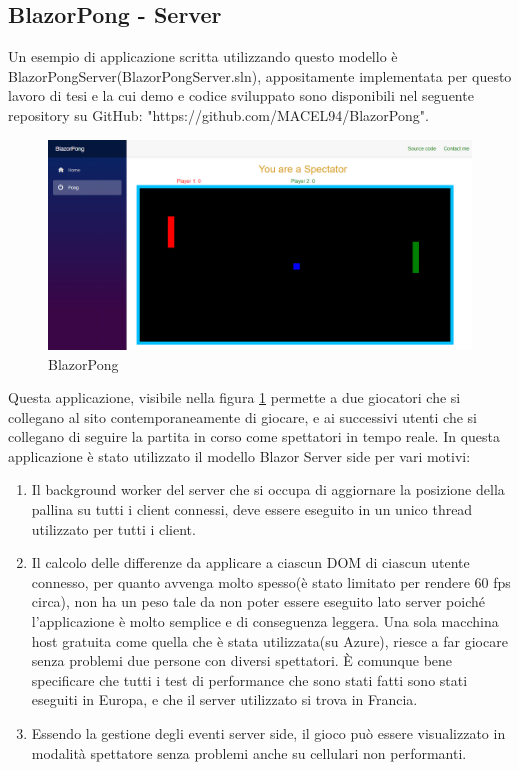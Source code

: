 \subsection{BlazorPong - Server}\label{sez:bpongserv}
Un esempio di applicazione scritta utilizzando questo modello \`e BlazorPongServer(BlazorPongServer.sln), appositamente implementata per questo lavoro di tesi e la cui demo e codice sviluppato sono disponibili nel seguente repository su GitHub: \linebreak "https://github.com/MACEL94/BlazorPong".

\begin{figure}[H]
	\centerline{\includegraphics[scale=0.3]{figure/BlazorPong.PNG}}
	\caption{BlazorPong}
	\label{fig:BlazorPong}
\end{figure}

Questa applicazione, visibile nella figura \ref{fig:BlazorPong} permette a due giocatori che si collegano al sito contemporaneamente di giocare, e ai successivi utenti che si collegano di seguire la partita in corso come spettatori in tempo reale.
In questa applicazione \`e stato utilizzato il modello Blazor Server side per vari motivi:
\begin{enumerate}
	\item Il background worker del server che si occupa di aggiornare la posizione della pallina su tutti i client connessi, deve essere eseguito in un unico thread utilizzato per tutti i client.
	\item Il calcolo delle differenze da applicare a ciascun DOM di ciascun utente connesso, per quanto avvenga molto spesso(\`e stato limitato per rendere 60 fps circa), non ha un peso tale da non poter essere eseguito lato server poich\'e l'applicazione \`e molto semplice e di conseguenza leggera.
	Una sola macchina host gratuita come quella che \`e stata utilizzata(su Azure), riesce a far giocare senza problemi due persone con diversi spettatori.
	\`E comunque bene specificare che tutti i test di performance che sono stati fatti sono stati eseguiti in Europa, e che il server utilizzato si trova in Francia.
	\item Essendo la gestione degli eventi server side, il gioco pu\`o essere visualizzato in modalit\`a spettatore senza problemi anche su cellulari non performanti.
\end{enumerate}

